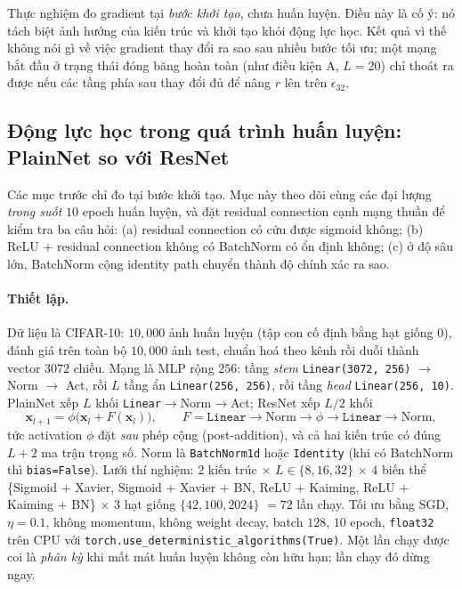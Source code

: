 \begin{notebox}
Thực nghiệm đo gradient tại \emph{bước khởi tạo}, chưa huấn luyện. Điều này là cố
ý: nó tách biệt ảnh hưởng của kiến trúc và khởi tạo khỏi động lực học. Kết quả
vì thế không nói gì về việc gradient thay đổi ra sao sau nhiều bước tối ưu;
một mạng bắt đầu ở trạng thái đóng băng hoàn toàn (như điều kiện A, $L=20$) chỉ
thoát ra được nếu các tầng phía sau thay đổi đủ để nâng $r$ lên trên
$\epsilon_{32}$.
\end{notebox}

\subsection{Động lực học trong quá trình huấn luyện: PlainNet so với ResNet}
\label{sec:training-dynamics}

Các mục trước chỉ đo tại bước khởi tạo. Mục này theo dõi cùng các đại lượng
\emph{trong suốt} $10$ epoch huấn luyện, và đặt residual connection cạnh mạng
thuần để kiểm tra ba câu hỏi: (a) residual connection có cứu được sigmoid không;
(b) ReLU + residual connection không có BatchNorm có ổn định không; (c) ở độ
sâu lớn, BatchNorm cộng identity path chuyển thành độ chính xác ra sao.

\paragraph{Thiết lập.} Dữ liệu là CIFAR-10: $10{,}000$ ảnh huấn luyện (tập con
cố định bằng hạt giống $0$), đánh giá trên toàn bộ $10{,}000$ ảnh test, chuẩn hoá
theo kênh rồi duỗi thành vector $3072$ chiều. Mạng là MLP rộng $256$: tầng
\emph{stem} \texttt{Linear(3072, 256)} $\to$ Norm $\to$ Act, rồi $L$ tầng ẩn
\texttt{Linear(256, 256)}, rồi tầng \emph{head} \texttt{Linear(256, 10)}.
PlainNet xếp $L$ khối \texttt{Linear}$\to$Norm$\to$Act; ResNet xếp $L/2$ khối
\[
  \mathbf{x}_{l+1} = \phi\big(\mathbf{x}_l + F(\mathbf{x}_l)\big),\qquad
  F = \texttt{Linear}\to\text{Norm}\to\phi\to\texttt{Linear}\to\text{Norm},
\]
tức activation $\phi$ đặt \emph{sau} phép cộng (post-addition), và cả hai kiến
trúc có đúng $L+2$ ma trận trọng số. Norm là \texttt{BatchNorm1d} hoặc
\texttt{Identity} (khi có BatchNorm thì \texttt{bias=False}). Lưới thí nghiệm:
$2$ kiến trúc $\times$ $L\in\{8,16,32\}$ $\times$ $4$ biến thể
\{Sigmoid + Xavier, Sigmoid + Xavier + BN, ReLU + Kaiming, ReLU + Kaiming + BN\}
$\times$ $3$ hạt giống $\{42, 100, 2024\}$ $=72$ lần chạy. Tối ưu bằng SGD,
$\eta=0.1$, không momentum, không weight decay, batch $128$, $10$ epoch,
\texttt{float32} trên CPU với \texttt{torch.use\_deterministic\_algorithms(True)}.
Một lần chạy được coi là \emph{phân kỳ} khi mất mát huấn luyện không còn hữu hạn;
lần chạy đó dừng ngay.

